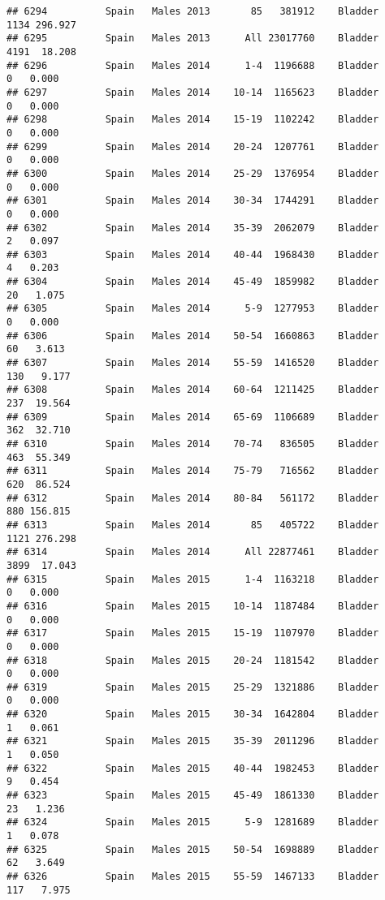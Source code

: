 \documentclass[
]{article}
\begin{document}
\begin{verbatim}
## 6294          Spain   Males 2013       85   381912    Bladder   1134 296.927
## 6295          Spain   Males 2013      All 23017760    Bladder   4191  18.208
## 6296          Spain   Males 2014      1-4  1196688    Bladder      0   0.000
## 6297          Spain   Males 2014    10-14  1165623    Bladder      0   0.000
## 6298          Spain   Males 2014    15-19  1102242    Bladder      0   0.000
## 6299          Spain   Males 2014    20-24  1207761    Bladder      0   0.000
## 6300          Spain   Males 2014    25-29  1376954    Bladder      0   0.000
## 6301          Spain   Males 2014    30-34  1744291    Bladder      0   0.000
## 6302          Spain   Males 2014    35-39  2062079    Bladder      2   0.097
## 6303          Spain   Males 2014    40-44  1968430    Bladder      4   0.203
## 6304          Spain   Males 2014    45-49  1859982    Bladder     20   1.075
## 6305          Spain   Males 2014      5-9  1277953    Bladder      0   0.000
## 6306          Spain   Males 2014    50-54  1660863    Bladder     60   3.613
## 6307          Spain   Males 2014    55-59  1416520    Bladder    130   9.177
## 6308          Spain   Males 2014    60-64  1211425    Bladder    237  19.564
## 6309          Spain   Males 2014    65-69  1106689    Bladder    362  32.710
## 6310          Spain   Males 2014    70-74   836505    Bladder    463  55.349
## 6311          Spain   Males 2014    75-79   716562    Bladder    620  86.524
## 6312          Spain   Males 2014    80-84   561172    Bladder    880 156.815
## 6313          Spain   Males 2014       85   405722    Bladder   1121 276.298
## 6314          Spain   Males 2014      All 22877461    Bladder   3899  17.043
## 6315          Spain   Males 2015      1-4  1163218    Bladder      0   0.000
## 6316          Spain   Males 2015    10-14  1187484    Bladder      0   0.000
## 6317          Spain   Males 2015    15-19  1107970    Bladder      0   0.000
## 6318          Spain   Males 2015    20-24  1181542    Bladder      0   0.000
## 6319          Spain   Males 2015    25-29  1321886    Bladder      0   0.000
## 6320          Spain   Males 2015    30-34  1642804    Bladder      1   0.061
## 6321          Spain   Males 2015    35-39  2011296    Bladder      1   0.050
## 6322          Spain   Males 2015    40-44  1982453    Bladder      9   0.454
## 6323          Spain   Males 2015    45-49  1861330    Bladder     23   1.236
## 6324          Spain   Males 2015      5-9  1281689    Bladder      1   0.078
## 6325          Spain   Males 2015    50-54  1698889    Bladder     62   3.649
## 6326          Spain   Males 2015    55-59  1467133    Bladder    117   7.975

\end{verbatim}
\end{document}
